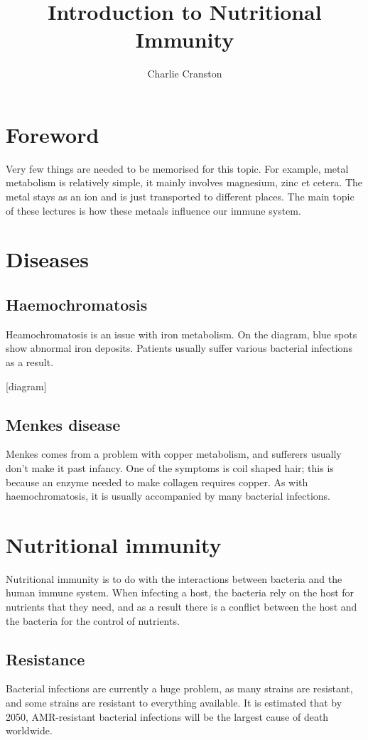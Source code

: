 

\title{Introduction to Nutritional Immunity}
\author{Charlie Cranston}
\maketitle

\section{Foreword}
Very few things are needed to be memorised for this topic. For example, metal metabolism is relatively simple, it mainly involves magnesium, zinc et cetera. The metal stays as an ion and is just transported to different places. The main topic of these lectures is how these metaals influence our immune system.

\section{Diseases}

\subsection{Haemochromatosis}
Heamochromatosis is an issue with iron metabolism. On the diagram, blue spots show abnormal iron deposits. Patients usually suffer various bacterial infections as a result.

[diagram]

\subsection{Menkes disease}
Menkes comes from a problem with copper metabolism, and sufferers usually don't make it past infancy. One of the symptoms is coil shaped hair; this is because an enzyme needed to make collagen requires copper. As with haemochromatosis, it is usually accompanied by many bacterial infections.

\section{Nutritional immunity}
Nutritional immunity is to do with the interactions between bacteria and the human immune system. When infecting a host, the bacteria rely on the host for nutrients that they need, and as a result there is a conflict between the host and the bacteria for the control of nutrients.

\subsection{Resistance}
Bacterial infections are currently a huge problem, as many strains are resistant, and some strains are resistant to everything available. It is estimated that by 2050, AMR-resistant bacterial infections will be the largest cause of death worldwide.

